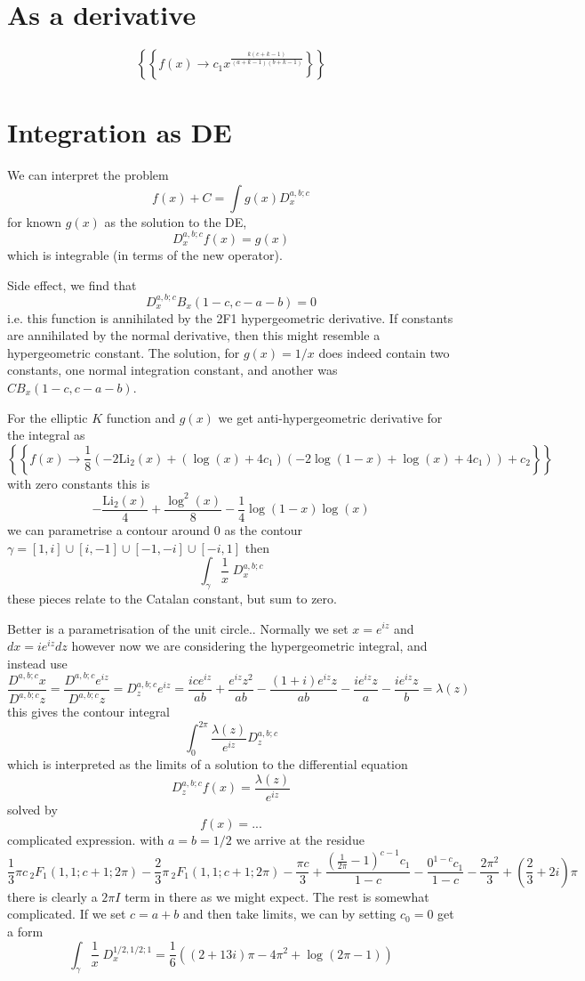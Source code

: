 \documentclass{article}
\begin{document}
\section{As a derivative}
$$
\left\{\left\{f(x)\to c_1 x^{\frac{k (c+k-1)}{(a+k-1) (b+k-1)}}\right\}\right\}
$$


\section{Integration as DE}
We can interpret the problem 
$$
f(x) + C = \int g(x) D_x^{a,b;c} 
$$
for known $g(x)$ as the solution to the DE, 
$$
D^{a,b;c}_x f(x) = g(x)
$$
which is integrable (in terms of the new operator). 

Side effect, we find that 
$$
D^{a,b;c}_x B_x(1-c,c-a-b) = 0
$$
i.e. this function is annihilated by the 2F1 hypergeometric derivative. If constants are annihilated by the normal derivative, then this might resemble a hypergeometric constant. The solution, for $g(x) = 1/x$ does indeed contain two constants, one normal integration constant, and another was $C B_x(1-c,c-a-b)$.

For the elliptic $K$ function and $g(x)$ we get anti-hypergeometric derivative for the integral as 
$$
\left\{\left\{f(x)\to \frac{1}{8} (-2 \text{Li}_2(x)+(\log (x)+4 c_1) (-2 \log (1-x)+\log (x)+4 c_1))+c_2\right\}\right\}
$$
with zero constants this is 
$$
 -\frac{\text{Li}_2(x)}{4}+\frac{\log ^2(x)}{8}-\frac{1}{4} \log (1-x) \log (x)
$$
we can parametrise a contour around $0$ as the contour $\gamma = [1,i]\cup[i,-1]\cup [-1,-i] \cup[-i,1]$ then 
$$
\int_\gamma \frac{1}{x} \; D^{a,b;c}_x 
$$
these pieces relate to the Catalan constant, but sum to zero.

Better is a parametrisation of the unit circle.. Normally we set $x = e^{i z}$ and $dx = i e^{i z} dz$ however now we are considering the hypergeometric integral, and instead use 
$$
\frac{D^{a,b;c} x}{D^{a,b;c} z} = \frac{D^{a,b;c} e^{i z}}{D^{a,b;c} z} = D_z^{a,b;c} e^{i z} = \frac{i c e^{i z}}{a b}+\frac{e^{i z} z^2}{a b}-\frac{(1+i) e^{i z} z}{a b}-\frac{i e^{i z} z}{a}-\frac{i e^{i z} z}{b} = \lambda(z)
$$
this gives the contour integral 
$$
\int_0^{2 \pi} \frac{\lambda(z)}{e^{i z}} D^{a,b;c}_z
$$
which is interpreted as the limits of a solution to the differential equation 
$$
D_z^{a,b;c} f(x) = \frac{\lambda(z)}{e^{i z}}
$$
solved by 
$$
f(x) = ...
$$
complicated expression. with $a=b=1/2$ we arrive at the residue 
$$
 \frac{1}{3} \pi  c \, _2F_1(1,1;c+1;2 \pi )-\frac{2}{3} \pi  \, _2F_1(1,1;c+1;2 \pi )-\frac{\pi  c}{3}+\frac{\left(\frac{1}{2 \pi }-1\right)^{c-1}
    c_1}{1-c}-\frac{0^{1-c} c_1}{1-c}-\frac{2 \pi ^2}{3}+\left(\frac{2}{3}+2 i\right) \pi
$$
there is clearly a $2 \pi I$ term in there as we might expect. The rest is somewhat complicated.
If we set $c=a+b$ and then take limits, we can by setting $c_0=0$ get a form 
$$
\int_\gamma \frac{1}{x} \; D^{1/2,1/2;1}_x  = \frac{1}{6} \left((2+13 i) \pi -4 \pi ^2+\log (2 \pi -1)\right)
$$
\end{document}
